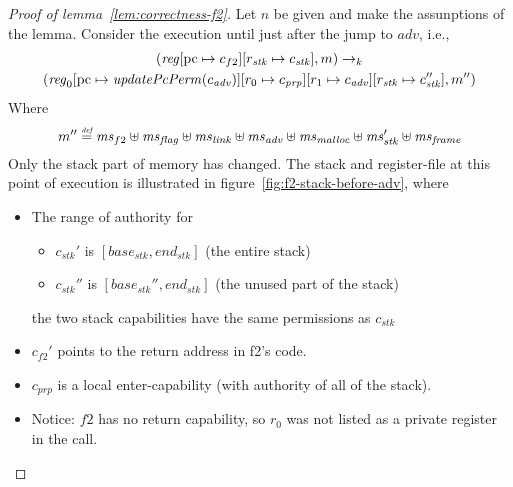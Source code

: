 \documentclass[a4paper]{article}
\newcommand{\update}[2]{[#1 \mapsto #2]}
\newcommand{\defeq}{\stackrel{\textit{\tiny{def}}}{=}}
\newcommand{\var}[1]{\mathit{#1}}
\newcommand{\hs}{\var{ms}}
\newcommand{\ms}{\hs}
\newcommand{\pcreg}{\mathrm{pc}}
\newcommand{\start}{\var{base}}
\newcommand{\addrend}{\var{end}}
\newcommand{\reg}{\var{reg}}
\newcommand{\adv}{\var{adv}}
\newcommand{\link}{\var{link}}
\newcommand{\stk}{\var{stk}}
\newcommand{\flag}{\var{flag}}
\newcommand{\plainfun}[2]{
  \ifthenelse{\equal{#2}{}}
  {\mathit{#1}}
  {\mathit{#1}(#2)}
}
\newcommand{\updatePcPerm}[1]{\plainfun{updatePcPerm}{#1}}
\newcommand{\codelabel}[1]{\mathit{#1}}
\newcommand{\malloc}{\codelabel{malloc}}
\newcommand{\step}[1][]{\rightarrow_{#1}}
\begin{document}
              \begin{proof}[Proof of lemma~\ref{lem:correctness-f2}]
                Let $n$ be given and make the assunptions of the lemma. Consider the execution until just after the jump to $\adv$, i.e.,
                \begin{multline*}
                  (\reg\update{\pcreg}{c_{f2}}\update{r_\stk}{c_\stk},m) \step[k] \\
                  (\reg_0\update{\pcreg}{\updatePcPerm{c_\adv}}\update{r_0}{c_{\var{prp}}}\update{r_1}{c_\adv}\update{r_\stk}{c_\stk''},m'')
                \end{multline*}
                Where 
                \[
                  m''  \defeq \hs_{f2} \uplus 
                  \hs_\flag \uplus                
                  \ms_\link \uplus 
                  \hs_\adv \uplus 
                  \ms_\malloc \uplus 
                  \ms_\stk' \uplus
                  \ms_{\var{frame}}
                \]
                Only the stack part of memory has changed. The stack and register-file at this point of execution is illustrated in figure~\ref{fig:f2-stack-before-adv}, where
                \begin{itemize}
                \item The range of authority for 
                  \begin{itemize}
                  \item $c_\stk'$ is $[\start_\stk,\addrend_\stk]$ (the entire stack)
                  \item $c_\stk''$ is $[\start_\stk'',\addrend_\stk]$ (the unused part of the stack)
                  \end{itemize}
                  the two stack capabilities have the same permissions as $c_\stk$
                \item $c_{f2}'$ points to the return address in f2's code.
                \item $c_{\var{prp}}$ is a local enter-capability (with authority of all of the stack).
                \item Notice: $f2$ has no return capability, so $r_0$ was not listed as a private register in the call.
                \end{itemize}


\end{proof}
\end{document}
